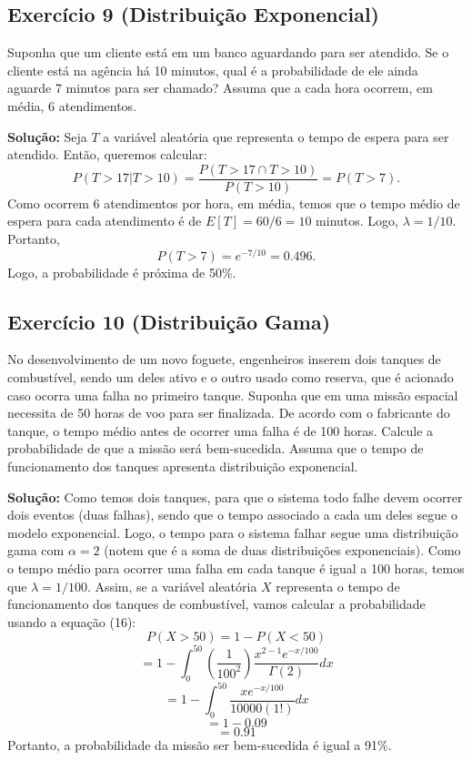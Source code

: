 \documentclass{article}
\begin{document}
\subsection{Exercício 9 (Distribuição Exponencial)}
Suponha que um cliente está em um banco aguardando para ser atendido. Se o cliente está na agência há 10 minutos, qual é a probabilidade de ele ainda aguarde 7 minutos para ser chamado? Assuma que a cada hora ocorrem, em média, 6 atendimentos.

\vspace{0.5cm}
\textbf{Solução:}
Seja $T$ a variável aleatória que representa o tempo de espera para ser atendido. Então, queremos calcular:
    $$
    P(T > 17 | T > 10) = \frac{P(T > 17 \cap T > 10)}{P(T > 10)}
    = P(T > 7).
    $$
Como ocorrem 6 atendimentos por hora, em média, temos que o tempo médio de espera para cada atendimento é de $E[T] = 60/6 = 10$ minutos. Logo, $\lambda = 1/10$. Portanto,
    $$
    P(T > 7) = e^{-7/10}
    = 0.496.
    $$
Logo, a probabilidade é próxima de 50\%.

\subsection{Exercício 10 (Distribuição Gama)}
No desenvolvimento de um novo foguete, engenheiros inserem dois tanques de combustível, sendo um deles ativo e o outro usado como reserva, que é acionado caso ocorra uma falha no primeiro tanque. Suponha que em uma missão espacial necessita de 50 horas de voo para ser finalizada. De acordo com o fabricante do tanque, o tempo médio antes de ocorrer uma falha é de 100 horas. Calcule a probabilidade de que a missão será bem-sucedida. Assuma que o tempo de funcionamento dos tanques apresenta distribuição exponencial.

\vspace{0.5cm}
\textbf{Solução:} Como temos dois tanques, para que o sistema todo falhe devem ocorrer dois eventos (duas falhas), sendo que o tempo associado a cada um deles segue o modelo exponencial. Logo, o tempo para o sistema falhar segue uma distribuição gama com $\alpha = 2$ (notem que é a soma de duas distribuições exponenciais). Como o tempo médio para ocorrer uma falha em cada tanque é igual a 100 horas, temos que $\lambda = 1/100$. Assim, se a variável aleatória $X$ representa o tempo de funcionamento dos tanques de combustível, vamos calcular a probabilidade usando a equação (16):
    $$
    P(X > 50) = 1 - P(X < 50)
    $$
    $$
    = 1 - \int_{0}^{50} 
    \left(\frac{1}{100^2}\right)\frac{x^{2-1} e^{-x/100}}{\Gamma(2)} dx
    $$
    $$
    = 1 - \int_{0}^{50} 
    \frac{x e^{-x/100}}{10000 (1!)} dx
    $$
    $$
    = 1 - 0.09
    $$
    $$
    = 0.91
    $$
Portanto, a probabilidade da missão ser bem-sucedida é igual a 91\%.
\end{document}
